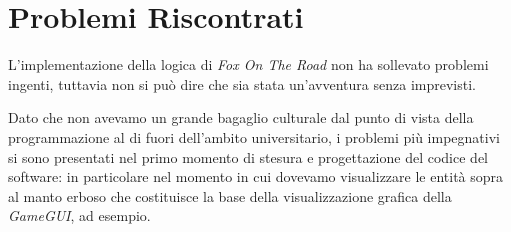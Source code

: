 \documentclass[12pt,a4paper]{report}
\begin{document}

\section{Problemi Riscontrati}\label{ch:proris}
L'implementazione della logica di \emph{Fox On The Road} non ha sollevato problemi ingenti, tuttavia non si può dire che sia stata un'avventura senza imprevisti.

Dato che non avevamo un grande bagaglio culturale dal punto di vista della programmazione al di fuori dell'ambito universitario, i problemi più impegnativi si sono presentati nel primo momento di stesura e progettazione del codice del software:
in particolare nel momento in cui dovevamo visualizzare le entità sopra al manto erboso che costituisce la base della visualizzazione grafica della \emph{GameGUI}, ad esempio.
\end{document}
